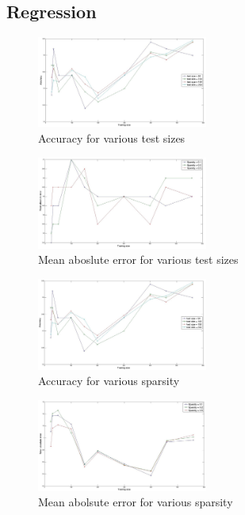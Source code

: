 \subsection{Regression}



\begin{figure}[h!]
	\caption{Accuracy for various test sizes}
	\centering
	\includegraphics[width=0.5\textwidth]{results/acc.jpg}
\end{figure}

\begin{figure}[h!]
	\caption{Mean aboslute error for various test sizes}
	\includegraphics[width=0.5\textwidth]{results/mae.jpg}
\end{figure}

\begin{figure}[h!]
	\caption{Accuracy for various sparsity}
	\includegraphics[width=0.5\textwidth]{results/acc2.jpg}
\end{figure}

\begin{figure}[h!]
	\caption{Mean abolsute error for various sparsity}
	\includegraphics[width=0.5\textwidth]{results/mae2.jpg}
\end{figure}


